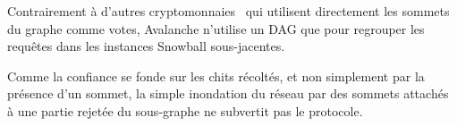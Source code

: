 \documentclass[letterpaper,twocolumn,10pt]{article}
\theoremstyle{definition}
\begin{document}
Contrairement à d'autres cryptomonnaies~\cite{IOTA} qui utilisent directement les sommets du graphe comme votes, Avalanche n'utilise un DAG que pour regrouper les requêtes dans les instances Snowball sous-jacentes.

Comme la confiance se fonde sur les chits récoltés, et non simplement par la présence d'un sommet, la simple inondation du réseau par des sommets attachés à une partie rejetée du sous-graphe ne subvertit pas le protocole.

\end{document}
